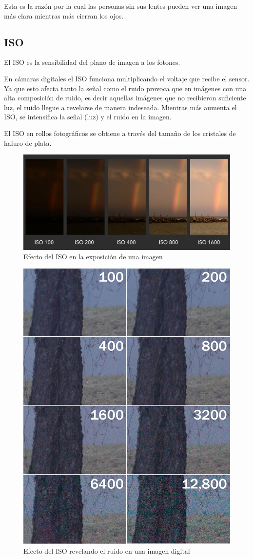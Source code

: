 \documentclass{article}
\begin{document}
Esta es la razón por la cual las personas sin sus lentes pueden ver una imagen más clara mientras más cierran los ojos.

\subsection{ISO}

El ISO es la sensibilidad del plano de imagen a los fotones.

En cámaras digitales el ISO funciona multiplicando el voltaje que recibe el sensor. Ya que esto afecta tanto la señal como el ruido provoca que en imágenes con una alta composición de ruido, es decir aquellas imágenes que no recibieron suficiente luz, el ruido llegue a revelarse de manera indeseada.
Mientras más aumenta el ISO, se intensifica la señal (luz) y el ruido en la imagen.

El ISO en rollos fotográficos se obtiene a través del tamaño de los cristales de haluro de plata.

\begin{figure}[H]
	\centering
	\includegraphics[width=1\linewidth]{Figuras/ISO}
	\caption{Efecto del ISO en la exposición de una imagen}
	\label{fig:iso}
\end{figure}

\begin{figure}[H]
	\centering
	\includegraphics[width=0.55\linewidth]{Figuras/ISO_2}
	\caption{Efecto del ISO revelando el ruido en una imagen digital}
	\label{fig:iso2}
\end{figure}
\end{document}
